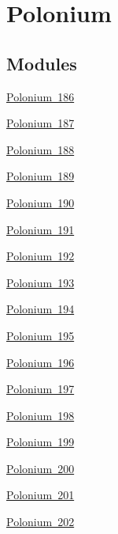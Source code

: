\hypertarget{group___isotope_const-_polonium}{}\section{Polonium}
\label{group___isotope_const-_polonium}
\subsection*{Modules}
\begin{DoxyCompactItemize}
\item 
\mbox{\hyperlink{group___isotope_const-_polonium-_po186}{Polonium 186}}
\item 
\mbox{\hyperlink{group___isotope_const-_polonium-_po187}{Polonium 187}}
\item 
\mbox{\hyperlink{group___isotope_const-_polonium-_po188}{Polonium 188}}
\item 
\mbox{\hyperlink{group___isotope_const-_polonium-_po189}{Polonium 189}}
\item 
\mbox{\hyperlink{group___isotope_const-_polonium-_po190}{Polonium 190}}
\item 
\mbox{\hyperlink{group___isotope_const-_polonium-_po191}{Polonium 191}}
\item 
\mbox{\hyperlink{group___isotope_const-_polonium-_po192}{Polonium 192}}
\item 
\mbox{\hyperlink{group___isotope_const-_polonium-_po193}{Polonium 193}}
\item 
\mbox{\hyperlink{group___isotope_const-_polonium-_po194}{Polonium 194}}
\item 
\mbox{\hyperlink{group___isotope_const-_polonium-_po195}{Polonium 195}}
\item 
\mbox{\hyperlink{group___isotope_const-_polonium-_po196}{Polonium 196}}
\item 
\mbox{\hyperlink{group___isotope_const-_polonium-_po197}{Polonium 197}}
\item 
\mbox{\hyperlink{group___isotope_const-_polonium-_po198}{Polonium 198}}
\item 
\mbox{\hyperlink{group___isotope_const-_polonium-_po199}{Polonium 199}}
\item 
\mbox{\hyperlink{group___isotope_const-_polonium-_po200}{Polonium 200}}
\item 
\mbox{\hyperlink{group___isotope_const-_polonium-_po201}{Polonium 201}}
\item 
\mbox{\hyperlink{group___isotope_const-_polonium-_po202}{Polonium 202}}
\item 

\end{DoxyCompactItemize}
